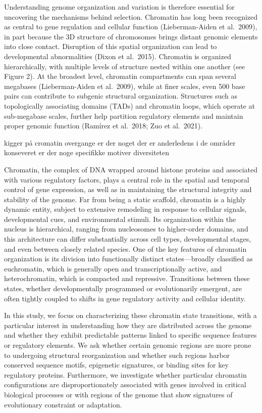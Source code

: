\documentclass[
  a4paper,
]{scrbook}
\begin{document}
Understanding genome organization and variation is therefore essential
for uncovering the mechanisms behind selection. Chromatin has long been
recognized as central to gene regulation and cellular function
(Lieberman-Aiden et al.~2009), in part because the 3D structure of
chromosomes brings distant genomic elements into close contact.
Disruption of this spatial organization can lead to developmental
abnormalities \cite{Dixon2015} (Dixon et al.~2015). Chromatin is
organized hierarchically, with multiple levels of structure nested
within one another (see Figure 2). At the broadest level, chromatin
compartments can span several megabases \cite{LiebermanAiden2009}
(Lieberman-Aiden et al.~2009), while at finer scales, even 500 base
pairs can contribute to subgenic structural organization. Structures
such as topologically associating domains (TADs) and chromatin loops,
which operate at sub-megabase scales, further help partition regulatory
elements and maintain proper genomic function
\cite{Ramirez2018}\cite{Zuo2021}(Ramírez et al.~2018; Zuo et al.~2021).

kigger på cromatin overgange er der noget der er anderledens i de
områder konseveret er der noge specifikke motiver diversiteten

Chromatin, the complex of DNA wrapped around histone proteins and
associated with various regulatory factors, plays a central role in the
spatial and temporal control of gene expression, as well as in
maintaining the structural integrity and stability of the genome. Far
from being a static scaffold, chromatin is a highly dynamic entity,
subject to extensive remodeling in response to cellular signals,
developmental cues, and environmental stimuli. Its organization within
the nucleus is hierarchical, ranging from nucleosomes to higher-order
domains, and this architecture can differ substantially across cell
types, developmental stages, and even between closely related species.
One of the key features of chromatin organization is its division into
functionally distinct states---broadly classified as euchromatin, which
is generally open and transcriptionally active, and heterochromatin,
which is compacted and repressive. Transitions between these states,
whether developmentally programmed or evolutionarily emergent, are often
tightly coupled to shifts in gene regulatory activity and cellular
identity.

In this study, we focus on characterizing these chromatin state
transitions, with a particular interest in understanding how they are
distributed across the genome and whether they exhibit predictable
patterns linked to specific sequence features or regulatory elements. We
ask whether certain genomic regions are more prone to undergoing
structural reorganization and whether such regions harbor conserved
sequence motifs, epigenetic signatures, or binding sites for key
regulatory proteins. Furthermore, we investigate whether particular
chromatin configurations are disproportionately associated with genes
involved in critical biological processes or with regions of the genome
that show signatures of evolutionary constraint or adaptation.
\end{document}
